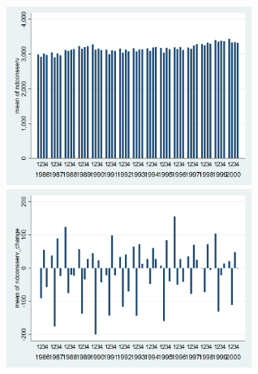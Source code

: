 \documentclass[12pt,a4paper]{article}
\begin{document}
\begin{center}
\includegraphics[width=8cm]{ndconsserv_quarterly.png}
\includegraphics[width=8cm]{ndconsserv_change_quarterly.png}\\

\end{center}
\end{document}
